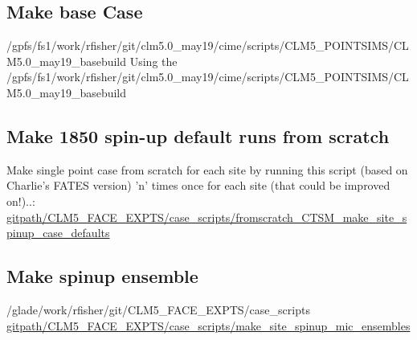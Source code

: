 \documentclass{article}
\begin{document}
\subsection{Make base Case}
/gpfs/fs1/work/rfisher/git/clm5.0_may19/cime/scripts/CLM5_POINTSIMS/CLM5.0_may19_basebuild
Using the /gpfs/fs1/work/rfisher/git/clm5.0_may19/cime/scripts/CLM5_POINTSIMS/CLM5.0_may19_basebuild

\subsection{Make 1850 spin-up default runs from scratch}
Make single point case from scratch for each site by running this script (based on Charlie's FATES version) 'n' times once for each site (that could be improved on!)..:\\
{\color{blue}\small{\url{gitpath/CLM5_FACE_EXPTS/case_scripts/fromscratch_CTSM_make_site_spinup_case_defaults}}}\\

\subsection{Make spinup ensemble}
/glade/work/rfisher/git/CLM5_FACE_EXPTS/case_scripts
{\color{blue}\small{\url{gitpath/CLM5_FACE_EXPTS/case_scripts/make_site_spinup_mic_ensembles
}}}\\
\end{document}
